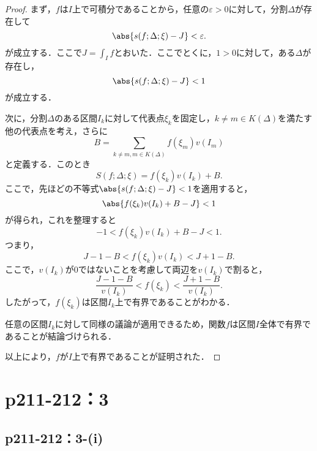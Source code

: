 \documentclass[a4paper,10pt,fleqn]{ltjsarticle}
\begin{document}
\begin{tleftbar}
    \begin{proof}
        まず，$f$は$I$上で可積分であることから，任意の$\varepsilon >0$に対して，分割$\Delta$が存在して
        \[
            \abs{s(f; \Delta; \xi) - J} < \varepsilon.
        \]
        が成立する．ここで$J = \int_I f$とおいた．ここでとくに，$1 >0$に対して，ある$\Delta$が存在し，
        \[
            \abs{ s(f; \Delta; \xi) - J } < 1
        \]
        が成立する．

        次に，分割$\Delta$のある区間$I_k$に対して代表点$\xi_k$を固定し，$k \ne m \in K(\Delta)$を満たす他の代表点を考え，さらに
        \[
            B = \sum_{k \ne m , m \in K(\Delta)} f(\xi_m) v(I_m)
        \]
        と定義する．このとき
        \[
            S(f; \Delta; \xi) = f(\xi_k) v(I_k) + B.
        \]
        ここで，先ほどの不等式$\abs{ s(f; \Delta; \xi) - J } < 1$を適用すると，
        \[
            \abs{ f(\xi_k) v(I_k) + B - J } < 1
        \]
        が得られ，これを整理すると
        \[
            -1 < f(\xi_k) v(I_k) + B - J < 1.
        \]
        つまり，
        \[
            J - 1 - B < f(\xi_k) v(I_k) < J + 1 - B.
        \]
        ここで，$v(I_k)$が$0$ではないことを考慮して両辺を$v(I_k)$で割ると，
        \[
            \frac{J - 1 - B}{v(I_k)} < f(\xi_k) < \frac{J + 1 - B}{v(I_k)}.
        \]
        したがって，$f(\xi_k)$は区間$I_k$上で有界であることがわかる．

        任意の区間$I_k$に対して同様の議論が適用できるため，関数$f$は区間$I$全体で有界であることが結論づけられる．

        以上により，$f$が$I$上で有界であることが証明された．
    \end{proof}
\end{tleftbar}


\section*{p211-212：3}


\subsection*{p211-212：3-(i)}
\end{document}
